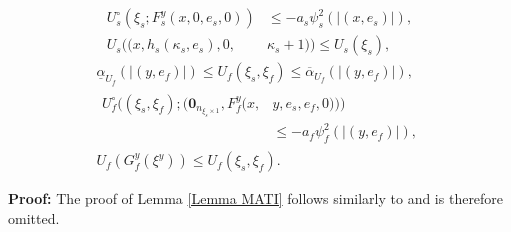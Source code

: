\begin{lem}
\begin{subequations}
\begin{align}
        \label{eqn: Us sandwich bound}
        \\
        U_s^\circ(\xi_s; F_s^y(x,0,e_s, 0)) &\leq -a_s \psi_s^2\left(\left| (x, e_s) \right|\right) ,\label{eqn: Us flow}
        \\
        {U_s}((x, h_s(\kappa_s, e_s), 0, & \kappa_s + 1))  \leq {U_s}(\xi_s),   \label{eqn: Us jump}
     \end{align}
     \label{eqn: Us}%
\end{subequations}
%
\vspace{-0.7cm}
\begin{subequations}
     \begin{gather}
        \underline{\alpha}_{U_f}\left(\left| (y, e_f) \right|\right)\leq {U_f}(\xi_s,\xi_f) \leq \overline{\alpha}_{U_f}\left(\left| (y, e_f) \right|\right) ,
        \label{eqn: Uf sandwich bound}%
        \\
        \begin{aligned}
        U_f^\circ \big((\xi_s,\xi_f); (\mathbf{0}_{n_{\xi_s \times 1}}, F_f^y(x,&y,e_s,e_f, 0))\big) 
            \\
            &\leq -a_f \psi_f^2 \left(\left| (y, e_f) \right|\right),
        \end{aligned}
        \label{eqn: Uf flow}%
        \\
        {U_f}(G_f^y(\xi^y))  \leq {U_f}(\xi_s,\xi_f).
        \label{eqn: Uf jump}
     \end{gather}
     \label{eqn: Uf}%
\end{subequations}
\end{lem}
%
\vspace{-0.5cm}
\textbf{Proof:} The proof of Lemma \ref{Lemma MATI} follows similarly to \cite[Theorem 1]{sampled_data_system} and is therefore omitted.

